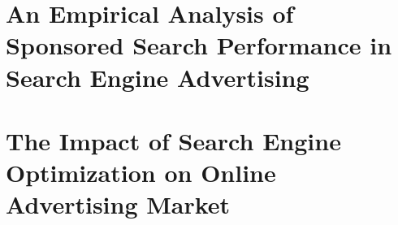 \documentclass[11pt]{article}
\begin{document}
\section{An Empirical Analysis of Sponsored Search Performance in Search Engine Advertising}

\newpage

%

\section{The Impact of Search Engine Optimization on Online Advertising Market}

\end{document}
